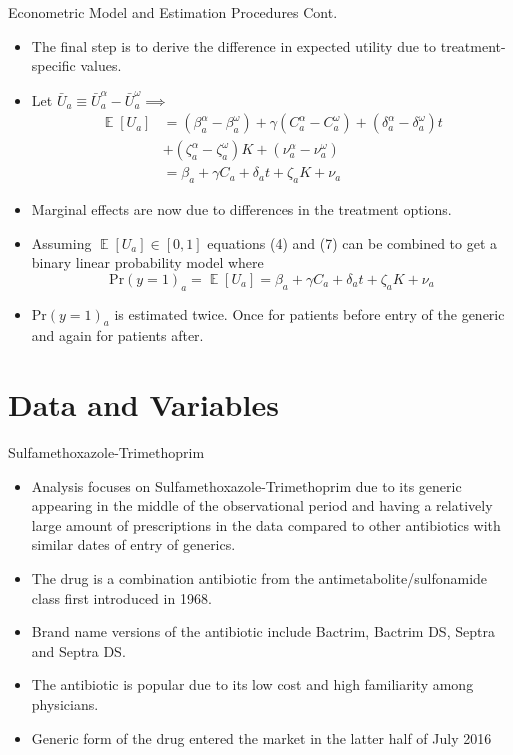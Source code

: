 \documentclass{beamer}
\DeclareMathOperator{\EX}{\mathbb{E}}
\begin{document}
\begin{frame}{Econometric Model and Estimation Procedures Cont.}
\begin{itemize}
\item The final step is to derive the difference in expected utility due to treatment-specific values.
\item Let $\bar{U}_a \equiv \bar{U}_a^\alpha - \bar{U}_a^\omega \implies$
\begin{equation}
\begin{split}
  \EX[U_a] & = (\beta_a^\alpha - \beta_a^\omega) + \gamma (C_a^\alpha - C_a^\omega) + (\delta_a^\alpha - \delta_a^\omega)t\\
  & + (\zeta^\alpha_a - \zeta^\omega_a)K + (\nu_a^\alpha - \nu_a^\omega)\\
  & = \beta_a + \gamma C_a + \delta_at + \zeta_aK + \nu_a
\end{split}
\end{equation}
\item Marginal effects are now due to differences in the treatment options.
\item Assuming $\EX[U_a] \in [0,1]$ equations (4) and (7) can be combined to get a binary linear probability model where
\begin{equation}
  \text{Pr}(y = 1)_a = \EX[U_a] = \beta_a + \gamma C_a + \delta_at + \zeta_aK + \nu_a
\end{equation}
\item $\text{Pr}(y = 1)_a$ is estimated twice. Once for patients before entry of the generic and again for patients after.
\end{itemize}  
\end{frame}

\section{Data and Variables}
\begin{frame}{Sulfamethoxazole-Trimethoprim}
\begin{itemize}
\item Analysis focuses on Sulfamethoxazole-Trimethoprim due to its generic appearing in the middle of the observational period and having a relatively large amount of prescriptions in the data compared to other antibiotics with similar dates of entry of generics.
\item The drug is a combination antibiotic from the antimetabolite/sulfonamide class first introduced in 1968.
\item Brand name versions of the antibiotic include Bactrim, Bactrim DS, Septra and Septra DS.
\item The antibiotic is popular due to its low cost and high familiarity among physicians.
\item Generic form of the drug entered the market in the latter half of July 2016
\end{itemize}

\end{frame}
\end{document}

